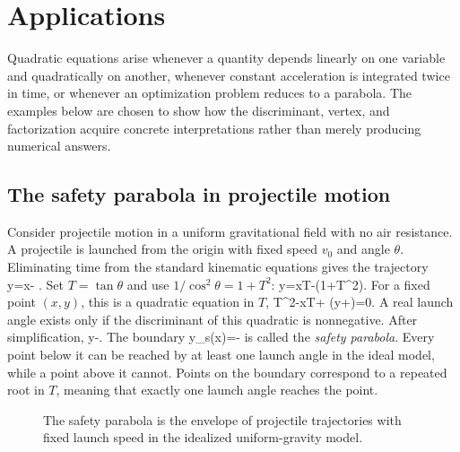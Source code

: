 \section{Applications}

Quadratic equations arise whenever a quantity depends linearly on one variable and quadratically on another, whenever constant acceleration is integrated twice in time, or whenever an optimization problem reduces to a parabola. The examples below are chosen to show how the discriminant, vertex, and factorization acquire concrete interpretations rather than merely producing numerical answers.

\subsection{The safety parabola in projectile motion}

Consider projectile motion in a uniform gravitational field with no air resistance. A projectile is launched from the origin with fixed speed $v_0$ and angle $\theta$. Eliminating time from the standard kinematic equations gives the trajectory
\be
 y=x\tan\theta-
 .
\ee
Set $T=\tan\theta$ and use $1/\cos^2\theta=1+T^2$:
\be
 y=xT-(1+T^2).
\ee
For a fixed point $(x,y)$, this is a quadratic equation in $T$,
\be
{}T^2-xT+
\left(y+\right)=0.
\ee
A real launch angle exists only if the discriminant of this quadratic is nonnegative. After simplification,
\be
 y\le {}-.
\ee
The boundary
\be
 y_s(x)=-
\ee
is called the \emph{safety parabola}. Every point below it can be reached by at least one launch angle in the ideal model, while a point above it cannot. Points on the boundary correspond to a repeated root in $T$, meaning that exactly one launch angle reaches the point.

\begin{figure}[htbp]
\centering
{}
\caption{The safety parabola is the envelope of projectile trajectories with fixed launch speed in the idealized uniform-gravity model.}
\end{figure}

